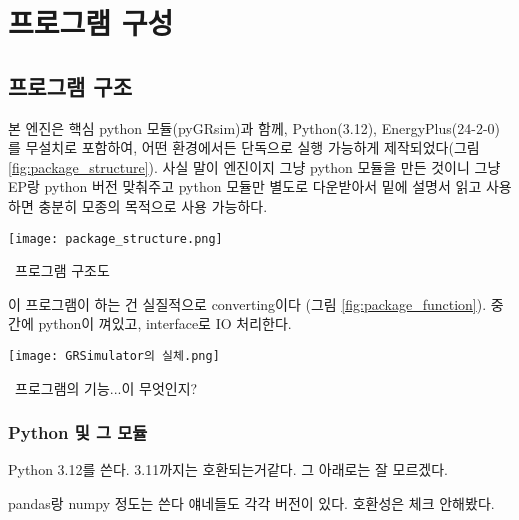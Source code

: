 \part{프로그램 구성}
\label{part:ioref}


\chapter{프로그램 구조}
본 엔진은 핵심 python 모듈(pyGRsim)과 함께, Python(3.12)\cite{python312}, EnergyPlus(24-2-0)\cite{energyplus242}를 무설치로 포함하여, 어떤 환경에서든 단독으로 실행 가능하게 제작되었다(그림 \ref{fig:package_structure}). 사실 말이 엔진이지 그냥 python 모듈을 만든 것이니 그냥 EP랑 python 버전 맞춰주고 python 모듈만 별도로 다운받아서 밑에 설명서 읽고 사용하면 충분히 모종의 목적으로 사용 가능하다.

\begin{defaultfigure}
  \texttt{[image: package\_structure.png]}
  \caption{\simulator\ 프로그램 구조도}
  \label{fig:package_structure}
\end{defaultfigure}

이 프로그램이 하는 건 실질적으로 converting이다 (그림 \ref{fig:package_function}). 중간에 python이 껴있고, interface로 IO 처리한다.

\begin{defaultfigure}
  \texttt{[image: GRSimulator의 실체.png]}
  \caption{\simulator\ 프로그램의 기능...이 무엇인지?}
  \label{fig:package_function}

  
\end{defaultfigure}

\section{Python 및 그 모듈}
Python 3.12를 쓴다. 3.11까지는 호환되는거같다. 그 아래로는 잘 모르겠다. \par
pandas랑 numpy 정도는 쓴다 얘네들도 각각 버전이 있다. 호환성은 체크 안해봤다.


